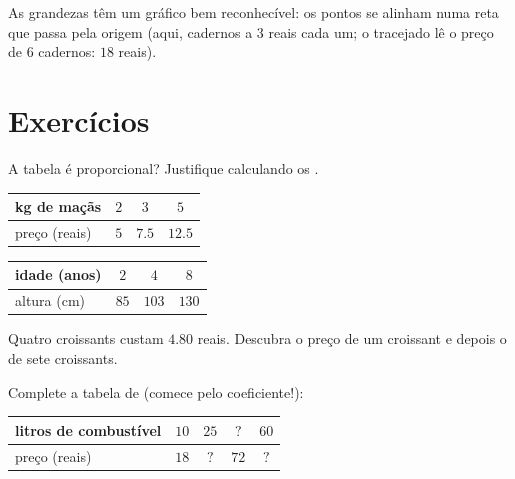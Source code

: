 \begin{omfigure}

{\small As grandezas  têm um gráfico bem reconhecível: os
pontos se alinham numa reta que passa pela origem (aqui, cadernos a
$3$ reais cada um; o tracejado lê o preço de $6$ cadernos: $18$
reais).}
\end{omfigure}

\section{Exercícios}

\begin{exercise}[$\star$]\label{exo:g6:propdata:1}
A tabela é proporcional? Justifique calculando os .
\begin{center}
\renewcommand{\arraystretch}{1.2}
\begin{tabular}{l|ccc}
kg de maçãs & $2$ & $3$ & $5$ \\
\hline
preço (reais) & $5$ & $7.5$ & $12.5$ \\
\end{tabular}
\qquad
\begin{tabular}{l|ccc}
idade (anos) & $2$ & $4$ & $8$ \\
\hline
altura (cm) & $85$ & $103$ & $130$ \\
\end{tabular}
\end{center}
\end{exercise}

\begin{exercise}[$\star$]\label{exo:g6:propdata:2}
Quatro croissants custam $4.80$ reais. Descubra o preço de um croissant
e depois o de sete croissants.
\end{exercise}

\begin{exercise}[$\star$]\label{exo:g6:propdata:3}
Complete a tabela de  (comece pelo coeficiente!):
\begin{center}
\renewcommand{\arraystretch}{1.2}
\begin{tabular}{l|cccc}
litros de combustível & $10$ & $25$ & $?$ & $60$ \\
\hline
preço (reais) & $18$ & $?$ & $72$ & $?$ \\
\end{tabular}
\end{center}
\end{exercise}

